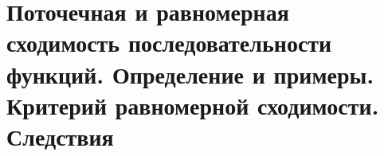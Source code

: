 \section{Поточечная и равномерная сходимость последовательности функций. Определение и примеры. Критерий равномерной сходимости. Следствия}

